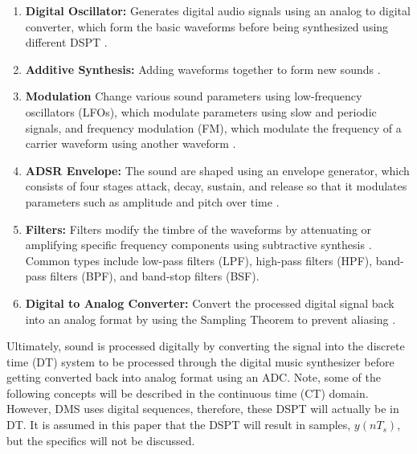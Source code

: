 \documentclass[12pt]{article}
\begin{document}
\begin{enumerate}
    \item \textbf{Digital Oscillator:} Generates digital audio signals using an analog to digital converter, which form the basic waveforms before being synthesized using different DSPT \cite{SS}.

    \item \textbf{Additive Synthesis:} Adding waveforms together to form new sounds \cite{SASP}.
    
    \item \textbf{Modulation} Change various sound parameters using low-frequency oscillators (LFOs), which modulate parameters using slow and periodic signals, and frequency modulation (FM), which modulate the frequency of a carrier waveform using another waveform \cite{MAMO}.
    
    \item \textbf{ADSR Envelope:} The sound are shaped using an envelope generator, which consists of four stages attack, decay, sustain, and release so that it modulates parameters such as amplitude and pitch over time \cite{TTEM}.

    \item \textbf{Filters:} Filters modify the timbre of the waveforms by attenuating or amplifying specific frequency components using subtractive synthesis \cite{TTEM}. Common types include low-pass filters (LPF), high-pass filters (HPF), band-pass filters (BPF), and band-stop filters (BSF).
    
    \item \textbf{Digital to Analog Converter:} Convert the processed digital signal back into an analog format by using the Sampling Theorem to prevent aliasing \cite{SO,FC}. 
\end{enumerate}

Ultimately, sound is processed digitally by converting the signal into the discrete time (DT) system to be processed through the digital music synthesizer before getting converted back into analog format using an ADC. Note, some of the following concepts will be described in the continuous time (CT) domain. However, DMS uses digital sequences, therefore, these DSPT will actually be in DT. It is assumed in this paper that the DSPT will result in samples, $y(nT_s)$, but the specifics will not be discussed.
\end{document}
